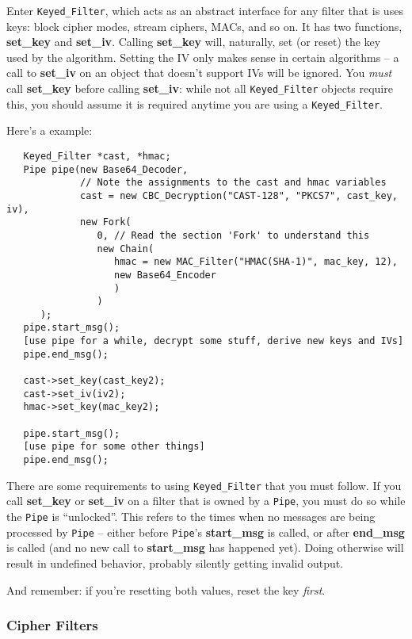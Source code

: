 \documentclass{article}
\newcommand{\function}[1]{\textbf{#1}}
\newcommand{\type}[1]{\texttt{#1}}
\begin{document}
Enter \type{Keyed\_Filter}, which acts as an abstract interface for
any filter that is uses keys: block cipher modes, stream ciphers,
MACs, and so on. It has two functions, \function{set\_key} and
\function{set\_iv}. Calling \function{set\_key} will, naturally, set
(or reset) the key used by the algorithm. Setting the IV only makes
sense in certain algorithms -- a call to \function{set\_iv} on an
object that doesn't support IVs will be ignored. You \emph{must} call
\function{set\_key} before calling \function{set\_iv}: while not all
\type{Keyed\_Filter} objects require this, you should assume it is
required anytime you are using a \type{Keyed\_Filter}.

Here's a example:

\begin{verbatim}
   Keyed_Filter *cast, *hmac;
   Pipe pipe(new Base64_Decoder,
             // Note the assignments to the cast and hmac variables
             cast = new CBC_Decryption("CAST-128", "PKCS7", cast_key, iv),
             new Fork(
                0, // Read the section 'Fork' to understand this
                new Chain(
                   hmac = new MAC_Filter("HMAC(SHA-1)", mac_key, 12),
                   new Base64_Encoder
                   )
                )
      );
   pipe.start_msg();
   [use pipe for a while, decrypt some stuff, derive new keys and IVs]
   pipe.end_msg();

   cast->set_key(cast_key2);
   cast->set_iv(iv2);
   hmac->set_key(mac_key2);

   pipe.start_msg();
   [use pipe for some other things]
   pipe.end_msg();
\end{verbatim}

There are some requirements to using \type{Keyed\_Filter} that you must
follow. If you call \function{set\_key} or \function{set\_iv} on a filter that
is owned by a \type{Pipe}, you must do so while the \type{Pipe} is
``unlocked''. This refers to the times when no messages are being processed by
\type{Pipe} -- either before \type{Pipe}'s \function{start\_msg} is called, or
after \function{end\_msg} is called (and no new call to \function{start\_msg}
has happened yet). Doing otherwise will result in undefined behavior, probably
silently getting invalid output.

And remember: if you're resetting both values, reset the key \emph{first}.

\subsubsection{Cipher Filters}
\end{document}
